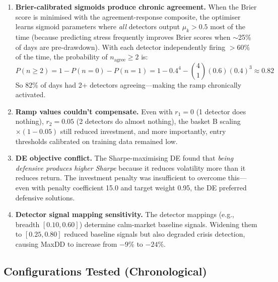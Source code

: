 \documentclass[11pt,a4paper]{article}
\begin{document}
\begin{enumerate}
  \item \textbf{Brier-calibrated sigmoids produce chronic agreement.} When the Brier score is minimised with the agreement-response composite, the optimiser learns sigmoid parameters where \emph{all} detectors output $\mu_k > 0.5$ most of the time (because predicting stress frequently improves Brier scores when $\sim$25\% of days are pre-drawdown). With each detector independently firing $> 60\%$ of the time, the probability of $n_{\mathrm{agree}} \ge 2$ is:
  \begin{equation}
    P(n \ge 2) = 1 - P(n=0) - P(n=1) = 1 - 0.4^4 - \binom{4}{1}(0.6)(0.4)^3 \approx 0.82
  \end{equation}
  So 82\% of days had 2+ detectors agreeing---making the ramp chronically activated.

  \item \textbf{Ramp values couldn't compensate.} Even with $r_1 = 0$ (1 detector does nothing), $r_2 = 0.05$ (2 detectors do almost nothing), the basket B scaling $\times(1 - 0.05)$ still reduced investment, and more importantly, entry thresholds calibrated on training data remained low.

  \item \textbf{DE objective conflict.} The Sharpe-maximising DE found that \emph{being defensive produces higher Sharpe} because it reduces volatility more than it reduces return. The investment penalty was insufficient to overcome this---even with penalty coefficient 15.0 and target weight 0.95, the DE preferred defensive solutions.

  \item \textbf{Detector signal mapping sensitivity.} The detector mappings (e.g., breadth $[0.10, 0.60]$) determine calm-market baseline signals. Widening them to $[0.25, 0.80]$ reduced baseline signals but also degraded crisis detection, causing MaxDD to increase from $-9\%$ to $-24\%$.
\end{enumerate}

\subsection{Configurations Tested (Chronological)}
\end{document}
